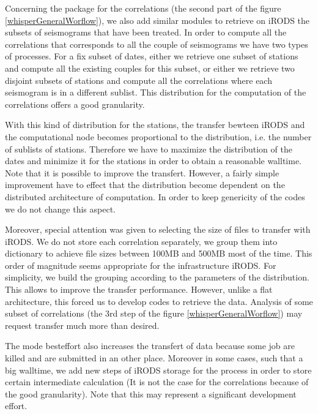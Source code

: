 \documentclass[a4paper, 10pt]{article}
\begin{document}
\begin{multicols}{2}
Concerning the package for the correlations (the second part of the figure \ref{whisperGeneralWorflow}), we also add similar modules
to retrieve on iRODS the subsets of seismograms that have been treated. In order to compute all the correlations that corresponds to
all the couple of seismograms we have two types of processes. For a fix subset of dates, either we retrieve one subset of stations 
and compute all the existing couples for this subset, or either we retrieve two disjoint subsets of stations and compute all the 
correlations where each seismogram is in a different sublist. This distribution for the computation of the correlations offers a good granularity.


With this kind of distribution for the stations, the transfer bewteen iRODS and the computational node becomes proportional to 
the distribution, i.e. the number of sublists of stations. Therefore we have to maximize the distribution of the dates and minimize it
for the stations in order to obtain a reasonable walltime. Note that it is possible to improve the transfert.
However, a fairly simple improvement have to effect that the distribution become dependent on the distributed architecture of computation.
In order to keep genericity of the codes we do not change this aspect.

Moreover, special attention was given to selecting the size of files to transfer with iRODS.
We do not store each correlation separately, we group them into dictionary to achieve file sizes between 100MB and 500MB most of the time. 
This order of magnitude seems appropriate for the infrastructure iRODS.
For simplicity, we build the grouping according to the parameters of the distribution. This allows to improve the transfer performance.
However, unlike a flat architecture, this forced us to develop codes to retrieve the data. Analysis of some subset of correlations (the 3rd step of the figure \ref{whisperGeneralWorflow}) may request transfer much more than desired.


The mode besteffort also increases the transfert of data because some job are killed and are submitted in an other place.
Moreover in some cases, such that a big walltime, we add new steps of iRODS storage for the process in order to store certain intermediate calculation
(It is not the case for the correlations because of the good granularity). Note that this may represent a significant development effort.



\end{multicols}
\end{document}
